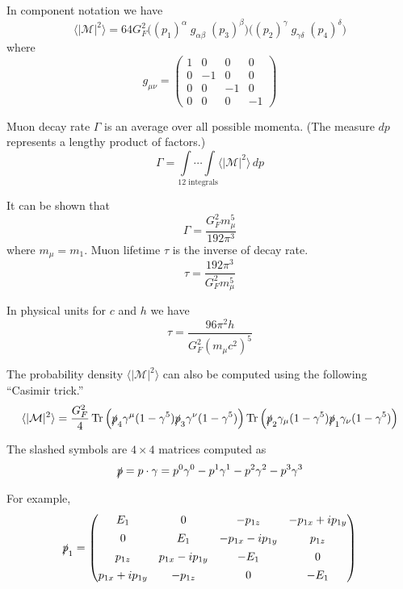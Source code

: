 \documentclass[12pt]{article}
\begin{document}
\noindent
In component notation we have
\begin{equation*}
\langle|\mathcal{M}|^2\rangle=64G_F^2
\bigg((p_1)^\alpha \; g_{\alpha\beta}\; (p_3)^\beta\bigg)
\bigg((p_2)^\gamma \; g_{\gamma\delta} \; (p_4)^\delta\bigg)
\end{equation*}
where
\begin{equation*}
g_{\mu\nu}=\begin{pmatrix}
1 & 0 & 0 & 0\\
0 & -1 & 0 & 0\\
0 & 0 & -1 & 0\\
0 & 0 & 0 & -1
\end{pmatrix}
\end{equation*}

\noindent
Muon decay rate $\Gamma$ is an average over all possible momenta.
(The measure $dp$ represents a lengthy product of factors.)
\begin{equation*}
\Gamma=
\underset{\text{12 integrals}}
{\int\cdots\int}
\langle|\mathcal{M}|^2\rangle\,dp
\end{equation*}

\noindent
It can be shown that
\begin{equation*}
\Gamma=\frac{G_F^2 m_\mu^5}{192\pi^3}
\end{equation*}
where $m_\mu=m_1$.
Muon lifetime $\tau$ is the inverse of decay rate.
\begin{equation*}
\tau=\frac{192\pi^3}{G_F^2 m_\mu^5}
\end{equation*}

\noindent
In physical units for $c$ and $h$ we have
\begin{equation*}
\tau=\frac{96\pi^2h}{G_F^2\left(m_\mu c^2\right)^5}
\end{equation*}

\noindent
The probability density $\langle|\mathcal{M}|^2\rangle$ can also be computed
using the following ``Casimir trick.''
\begin{equation*}
\langle|\mathcal{M}|^2\rangle
=\frac{G_F^2}{4}
\mathop{\text{Tr}}
\left(\slashed{p}_4\gamma^\mu(1-\gamma^5)\slashed{p}_3\gamma^\nu(1-\gamma^5)\right)
\mathop{\text{Tr}}
\left(\slashed{p}_2\gamma_\mu(1-\gamma^5)\slashed{p}_1\gamma_\nu(1-\gamma^5)\right)
\end{equation*}

\noindent
The slashed symbols are $4\times4$ matrices computed as
\begin{equation*}
\slashed{p}=p\cdot\gamma
=p^0\gamma^0-p^1\gamma^1-p^2\gamma^2-p^3\gamma^3
\end{equation*}

\noindent
For example,
\begin{equation*}
\slashed{p}_1=\begin{pmatrix}
E_1 & 0 & -p_{1z} & -p_{1x} + ip_{1y}
\\[1ex]
0 & E_1 & -p_{1x} - ip_{1y} & p_{1z}
\\[1ex]
p_{1z} & p_{1x} - i p_{1y} & -E_1 & 0
\\[1ex]
p_{1x} + ip_{1y} & -p_{1z} & 0 & -E_1
\end{pmatrix}
\end{equation*}
\end{document}
